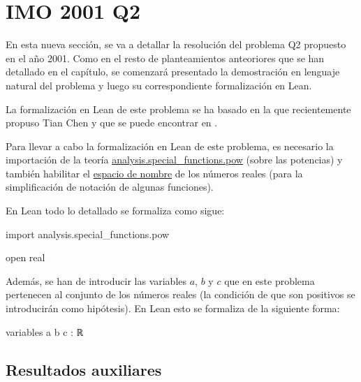 \section{IMO 2001 Q2}

En esta nueva sección, se va a detallar la resolución del problema Q2
propuesto en el año 2001. Como en el resto de planteamientos anteoriores
que se han detallado en el capítulo, se comenzará presentado la
demostración en lenguaje natural del problema y luego su correspondiente
formalización en Lean.

La formalización en Lean de este problema se ha basado en la que
recientemente propuso Tian Chen y que se puede encontrar en \cite{TCC}.

\noindent
{}

Para llevar a cabo la formalización en Lean de este problema, es
necesario la importación de la teoría
\href{https://github.com/leanprover-community/mathlib/blob/master/src/analysis/special_functions/pow.lean}
{analysis.special\_functions.pow} (sobre las potencias) y también
habilitar el
\href{https://leanprover.github.io/reference/other_commands.html#namespaces}
{espacio de nombre} de los números reales (para la simplificación de
notación de algunas funciones).

En Lean todo lo detallado se formaliza como sigue:
\begin{leancode}
import analysis.special_functions.pow

open real
\end{leancode}

Además, se han de introducir las variables \(a\), \(b\) y \(c\) que en
este problema pertenecen al conjunto de los números reales (la condición
de que son positivos se introducirán como hipótesis). En Lean esto se
formaliza de la siguiente forma:
\begin{leancode}
variables {a b c : ℝ}
\end{leancode}

\subsection{Resultados auxiliares}

